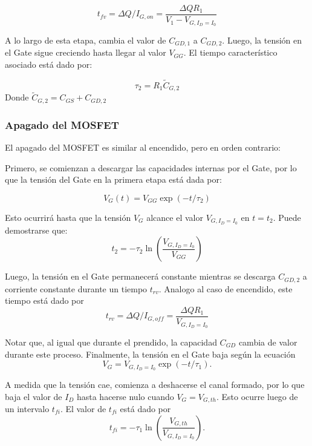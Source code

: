 \documentclass[e4_tp1_main.tex]{subfiles}
\begin{document}
\begin{equation}
t_{fv} = \Delta Q/I_{G,on} = \frac{\Delta Q R_1}{V_{1}-V_{G,I_D=I_0}}
\end{equation}

A lo largo de esta etapa, cambia el valor de $C_{GD,1}$ a $C_{GD,2}$. Luego, la tensión en el Gate sigue creciendo hasta llegar al valor $V_{GG}$. El tiempo característico asociado está dado por:

\begin{equation}
\tau_2 = R_1\tilde{C}_{G,2}
\end{equation}
Donde $\tilde{C}_{G,2} = C_{GS} + C_{GD,2}$

\subsubsection{Apagado del MOSFET}

El apagado del MOSFET es similar al encendido, pero en orden contrario:

Primero, se comienzan a descargar las capacidades internas por el Gate, por lo que la tensión del Gate en la primera etapa está dada por:

\begin{equation}
V_G(t) = V_{GG} \exp(-t/\tau_2)
\end{equation}

Esto ocurrirá hasta que la tensión $V_G$ alcance el valor $V_{G,I_D=I_0}$ en $t=t_2$. Puede demostrarse que:
\begin{equation}
t_2= -\tau_2\ln\left(\frac{V_{G,I_D=I_0}}{V_{GG}}\right)
\end{equation}

Luego, la tensión en el Gate permanecerá constante mientras se descarga $C_{GD,2}$ a corriente constante durante un tiempo $t_{rv}$. Analogo al caso de encendido, este tiempo está dado por
\begin{equation}
t_{rv} = \Delta Q/I_{G,off} = \frac{\Delta Q R_1}{V_{G,I_D=I_0}}
\end{equation}

Notar que, al igual que durante el prendido, la capacidad $C_{GD}$ cambia de valor durante este proceso. Finalmente, la tensión en el Gate baja según la ecuación
\begin{equation}
V_{G} = V_{G,I_D=I_0}\exp(-t/\tau_1).
\end{equation}

A medida que la tensión cae, comienza a deshacerse el canal formado, por lo que baja el valor de $I_D$ hasta hacerse nulo cuando $V_G=V_{G,th}$. Esto ocurre luego de un intervalo $t_{fi}$. El valor de $t_{fi}$ está dado por
\begin{equation}
t_{fi}= -\tau_1\ln\left(\frac{V_{G,th}}{V_{G,I_D=I_0}}\right).
\end{equation}
\end{document}
